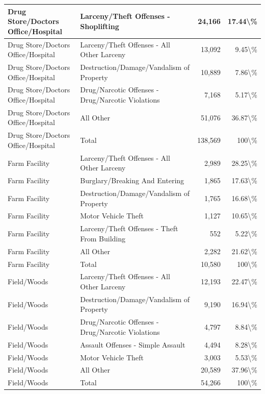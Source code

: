 \documentclass[
]{krantz}
\begin{document}
\begin{longtable}[t]{l|l|r|r}
\hline
Drug Store/Doctors Office/Hospital & Larceny/Theft Offenses - Shoplifting & 24,166 & 17.44\textbackslash{}\%\\
\hline
Drug Store/Doctors Office/Hospital & Larceny/Theft Offenses - All Other Larceny & 13,092 & 9.45\textbackslash{}\%\\
\hline
Drug Store/Doctors Office/Hospital & Destruction/Damage/Vandalism of Property & 10,889 & 7.86\textbackslash{}\%\\
\hline
Drug Store/Doctors Office/Hospital & Drug/Narcotic Offenses - Drug/Narcotic Violations & 7,168 & 5.17\textbackslash{}\%\\
\hline
Drug Store/Doctors Office/Hospital & All Other & 51,076 & 36.87\textbackslash{}\%\\
\hline
Drug Store/Doctors Office/Hospital & Total & 138,569 & 100\textbackslash{}\%\\
\hline
Farm Facility & Larceny/Theft Offenses - All Other Larceny & 2,989 & 28.25\textbackslash{}\%\\
\hline
Farm Facility & Burglary/Breaking And Entering & 1,865 & 17.63\textbackslash{}\%\\
\hline
Farm Facility & Destruction/Damage/Vandalism of Property & 1,765 & 16.68\textbackslash{}\%\\
\hline
Farm Facility & Motor Vehicle Theft & 1,127 & 10.65\textbackslash{}\%\\
\hline
Farm Facility & Larceny/Theft Offenses - Theft From Building & 552 & 5.22\textbackslash{}\%\\
\hline
Farm Facility & All Other & 2,282 & 21.62\textbackslash{}\%\\
\hline
Farm Facility & Total & 10,580 & 100\textbackslash{}\%\\
\hline
Field/Woods & Larceny/Theft Offenses - All Other Larceny & 12,193 & 22.47\textbackslash{}\%\\
\hline
Field/Woods & Destruction/Damage/Vandalism of Property & 9,190 & 16.94\textbackslash{}\%\\
\hline
Field/Woods & Drug/Narcotic Offenses - Drug/Narcotic Violations & 4,797 & 8.84\textbackslash{}\%\\
\hline
Field/Woods & Assault Offenses - Simple Assault & 4,494 & 8.28\textbackslash{}\%\\
\hline
Field/Woods & Motor Vehicle Theft & 3,003 & 5.53\textbackslash{}\%\\
\hline
Field/Woods & All Other & 20,589 & 37.96\textbackslash{}\%\\
\hline
Field/Woods & Total & 54,266 & 100\textbackslash{}\%\\

\end{longtable}
\end{document}
